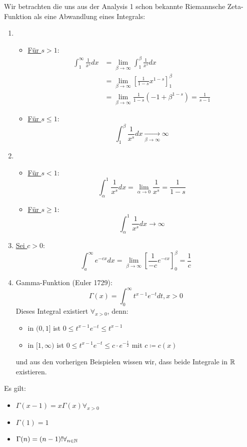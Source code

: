 \begin{example}
Wir betrachten die uns aus der Analysis 1 schon bekannte Riemannsche Zeta-Funktion als eine Abwandlung eines Integrals:
\begin{enumerate}
	\item 
\begin{itemize}
	\item \underline{Für $s > 1$}: \begin{align*}
			\int_1^{\infty} \frac{1}{x^s}dx &= \lim_{\beta \to \infty} \int_1^{\beta} \frac{1}{x^s}dx \\
							&= \lim_{\beta \to \infty} \left[ \frac{1}{1-s} x^{1-s} \right]_1^{\beta} \\
							&= \lim_{\beta \to \infty} \frac{1}{1-s} (-1+\beta^{1-s})=\frac{1}{s-1}
	\end{align*}
\item \underline{Für $s\le 1$}:
	\[
		\int_1^{\beta} \frac{1}{x^s}dx \underset{\beta \to \infty}{\to} \infty
	\]
\end{itemize}
\item \begin{itemize}

\item \underline{Für $s<1$}:
	\[
		\int_{\alpha}^1 \frac{1}{x^s} dx = \lim_{\alpha \to 0} \frac{1}{x^s} = \frac{1}{1-s}
	\]
\item \underline{Für $s \ge 1$}:
	\[
		\int_{\alpha}^1 \frac{1}{x^s}dx \to \infty
	\]
\end{itemize}
\item \underline{Sei $c >0$}:
	\[
		\int_a^{\infty} e^{-cx} dx = \lim_{\beta \to \infty} \left[ \frac{1}{-c}e^{-cx} \right]_0^{\beta} = \frac{1}{c}
	\]

\item Gamma-Funktion (Euler 1729):
	\[
		\Gamma (x)= \int_0^{\infty} t^{x-1} e^{-t} dt , x>0
	\]
	Dieses Integral existiert $\forall_{x>0}$, denn:
	\begin{itemize}
		\item  in $(0,1]$ ist $0\le t^{x-1}e^{-t} \le t^{x-1}$
		\item in $[1,\infty)$ ist $0 \le t^{x-1}e^{-t} \le  c \cdot e^{-\frac{t}{2}}$ mit $c \coloneqq c(x)$ 
	\end{itemize}
	und aus den vorherigen Beispielen wissen wir, dass beide Integrale in $\mathbb{R}$ existieren.
\end{enumerate}
\end{example}
\begin{theorem}
	Es gilt:
	\begin{itemize}
		\item $\Gamma(x-1)= x \Gamma(x) \forall_{x>0} $
		\item $\Gamma(1)=1$
		\item $\Gamma(n)= (n-1)! \forall_{n \in \mathbb{N}} $ 
	\end{itemize}
\end{theorem}

